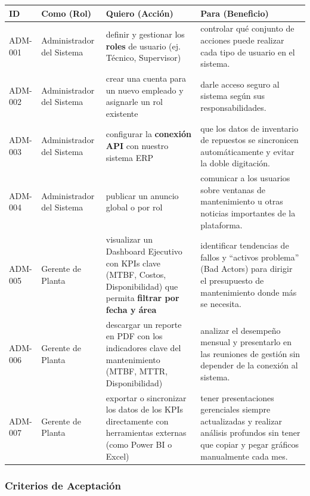 \documentclass[12pt, a4paper]{article}
\begin{document}
\begin{longtable}{|p{2cm}|p{3.5cm}|p{5cm}|p{4.5cm}|}
\hline
\textbf{ID} & \textbf{Como (Rol)} & \textbf{Quiero (Acción)} & \textbf{Para (Beneficio)} \\ \hline
ADM-001 & Administrador del Sistema & definir y gestionar los \textbf{roles} de usuario (ej. Técnico, Supervisor) & controlar qué conjunto de acciones puede realizar cada tipo de usuario en el sistema. \\ \hline
ADM-002 & Administrador del Sistema & crear una cuenta para un nuevo empleado y asignarle un rol existente & darle acceso seguro al sistema según sus responsabilidades. \\ \hline
ADM-003 & Administrador del Sistema & configurar la \textbf{conexión API} con nuestro sistema ERP & que los datos de inventario de repuestos se sincronicen automáticamente y evitar la doble digitación. \\ \hline
ADM-004 & Administrador del Sistema & publicar un anuncio global o por rol & comunicar a los usuarios sobre ventanas de mantenimiento u otras noticias importantes de la plataforma. \\ \hline
ADM-005 & Gerente de Planta & visualizar un Dashboard Ejecutivo con KPIs clave (MTBF, Costos, Disponibilidad) que permita \textbf{filtrar por fecha y área} & identificar tendencias de fallos y ``activos problema'' (Bad Actors) para dirigir el presupuesto de mantenimiento donde más se necesita. \\ \hline
ADM-006 & Gerente de Planta & descargar un reporte en PDF con los indicadores clave del mantenimiento (MTBF, MTTR, Disponibilidad) & analizar el desempeño mensual y presentarlo en las reuniones de gestión sin depender de la conexión al sistema. \\ \hline
ADM-007 & Gerente de Planta & exportar o sincronizar los datos de los KPIs directamente con herramientas externas (como Power BI o Excel) & tener presentaciones gerenciales siempre actualizadas y realizar análisis profundos sin tener que copiar y pegar gráficos manualmente cada mes. \\ \hline
\end{longtable}

\subsubsection*{Criterios de Aceptación}
\end{document}
